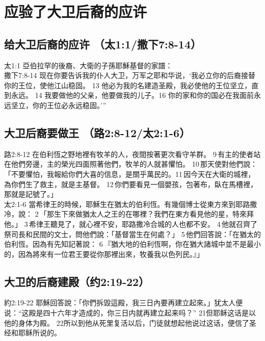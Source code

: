 \section{应验了大卫后裔的应许}
\subsection{给大卫后裔的应许 （太1:1/撒下7:8-14）}
太1:1 亞伯拉罕的後裔、大衛的子孫耶穌基督的家譜：\\
撒下7:8-14 现在你要告诉我的仆人大卫，万军之耶和华说，‘我必立你的后裔接替你的王位，使他江山稳固。 13 他必为我的名建造圣殿，我必使他的王位坚立，直到永远。 14 我要做他的父亲，他要做我的儿子。16 你的家和你的国必在我面前永远坚立，你的王位必永远稳固。’”\\

\subsection{大卫后裔要做王 （路2:8-12/太2:1-6）}
路2:8-12 在伯利恆之野地裡有牧羊的人，夜間按著更次看守羊群。 9 有主的使者站在他們旁邊，主的榮光四面照著他們，牧羊的人就甚懼怕。 10 那天使對他們說：「不要懼怕，我報給你們大喜的信息，是關乎萬民的。11 因今天在大衛的城裡，為你們生了救主，就是主基督。 12 你們要看見一個嬰孩，包著布，臥在馬槽裡，那就是記號了。」\\
太2:1-6 當希律王的時候，耶穌生在猶太的伯利恆。有幾個博士從東方來到耶路撒冷，說： 2 「那生下來做猶太人之王的在哪裡？我們在東方看見他的星，特來拜他。」 3 希律王聽見了，就心裡不安，耶路撒冷合城的人也都不安。 4 他就召齊了祭司長和民間的文士，問他們說：「基督當生在何處？」 5 他們回答說：「在猶太的伯利恆。因為有先知記著說： 6 『猶大地的伯利恆啊，你在猶大諸城中並不是最小的，因為將來有一位君王要從你那裡出來，牧養我以色列民。』」\\


\subsection{大卫的后裔建殿（约2:19-22）}
約2:19-22 耶穌回答說：「你們拆毀這殿，我三日內要再建立起來。」犹太人便说：“这殿是四十六年才造成的，你三日内就再建立起来吗？” 21但耶稣这话是以他的身体为殿。 22所以到他从死里复活以后，门徒就想起他说过这话，便信了圣经和耶稣所说的。\\



